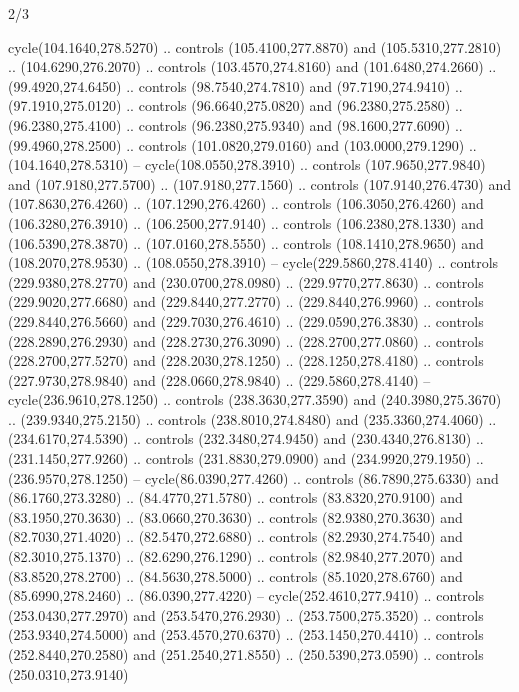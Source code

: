 \begin{flagdescription}{2/3}
\begin{scope}[xshift=0.5\flaglength,yshift=0.5\flagwidth,scale=\stretchfactor]
\begin{scope}[scale=0.001645\flagwidth,yshift=65mm,xshift=-63mm]
\begin{scope}[y=0.80pt, x=0.80pt, yscale=-1,]
\begin{scope}[cm={{1.33333,0.0,0.0,1.33333,(0.0,1e-05)}}]
  cycle(104.1640,278.5270) .. controls (105.4100,277.8870) and
  (105.5310,277.2810) .. (104.6290,276.2070) .. controls (103.4570,274.8160) and
  (101.6480,274.2660) .. (99.4920,274.6450) .. controls (98.7540,274.7810) and
  (97.7190,274.9410) .. (97.1910,275.0120) .. controls (96.6640,275.0820) and
  (96.2380,275.2580) .. (96.2380,275.4100) .. controls (96.2380,275.9340) and
  (98.1600,277.6090) .. (99.4960,278.2500) .. controls (101.0820,279.0160) and
  (103.0000,279.1290) .. (104.1640,278.5310) -- cycle(108.0550,278.3910) ..
  controls (107.9650,277.9840) and (107.9180,277.5700) .. (107.9180,277.1560) ..
  controls (107.9140,276.4730) and (107.8630,276.4260) .. (107.1290,276.4260) ..
  controls (106.3050,276.4260) and (106.3280,276.3910) .. (106.2500,277.9140) ..
  controls (106.2380,278.1330) and (106.5390,278.3870) .. (107.0160,278.5550) ..
  controls (108.1410,278.9650) and (108.2070,278.9530) .. (108.0550,278.3910) --
  cycle(229.5860,278.4140) .. controls (229.9380,278.2770) and
  (230.0700,278.0980) .. (229.9770,277.8630) .. controls (229.9020,277.6680) and
  (229.8440,277.2770) .. (229.8440,276.9960) .. controls (229.8440,276.5660) and
  (229.7030,276.4610) .. (229.0590,276.3830) .. controls (228.2890,276.2930) and
  (228.2730,276.3090) .. (228.2700,277.0860) .. controls (228.2700,277.5270) and
  (228.2030,278.1250) .. (228.1250,278.4180) .. controls (227.9730,278.9840) and
  (228.0660,278.9840) .. (229.5860,278.4140) -- cycle(236.9610,278.1250) ..
  controls (238.3630,277.3590) and (240.3980,275.3670) .. (239.9340,275.2150) ..
  controls (238.8010,274.8480) and (235.3360,274.4060) .. (234.6170,274.5390) ..
  controls (232.3480,274.9450) and (230.4340,276.8130) .. (231.1450,277.9260) ..
  controls (231.8830,279.0900) and (234.9920,279.1950) .. (236.9570,278.1250) --
  cycle(86.0390,277.4260) .. controls (86.7890,275.6330) and (86.1760,273.3280)
  .. (84.4770,271.5780) .. controls (83.8320,270.9100) and (83.1950,270.3630) ..
  (83.0660,270.3630) .. controls (82.9380,270.3630) and (82.7030,271.4020) ..
  (82.5470,272.6880) .. controls (82.2930,274.7540) and (82.3010,275.1370) ..
  (82.6290,276.1290) .. controls (82.9840,277.2070) and (83.8520,278.2700) ..
  (84.5630,278.5000) .. controls (85.1020,278.6760) and (85.6990,278.2460) ..
  (86.0390,277.4220) -- cycle(252.4610,277.9410) .. controls (253.0430,277.2970)
  and (253.5470,276.2930) .. (253.7500,275.3520) .. controls (253.9340,274.5000)
  and (253.4570,270.6370) .. (253.1450,270.4410) .. controls (252.8440,270.2580)
  and (251.2540,271.8550) .. (250.5390,273.0590) .. controls (250.0310,273.9140)

\end{scope}
\end{scope}
\end{scope}
\end{scope}
\end{flagdescription}
